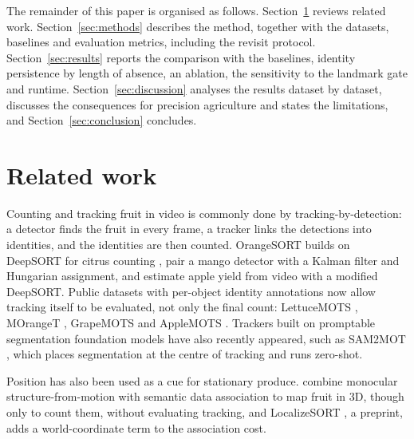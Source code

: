 \documentclass[pdflatex,sn-basic]{sn-jnl}%
\theoremstyle{thmstyleone}%
\begin{document}
The remainder of this paper is organised as follows.
Section~\ref{sec:related} reviews related work.
Section~\ref{sec:methods} describes the method, together with the datasets, baselines and evaluation metrics, including the revisit protocol.
Section~\ref{sec:results} reports the comparison with the baselines, identity persistence by length of absence, an ablation, the sensitivity to the landmark gate and runtime.
Section~\ref{sec:discussion} analyses the results dataset by dataset, discusses the consequences for precision agriculture and states the limitations, and Section~\ref{sec:conclusion} concludes.

\section{Related work}\label{sec:related}

Counting and tracking fruit in video is commonly done by tracking-by-detection: a detector finds the fruit in every frame, a tracker links the detections into identities, and the identities are then counted.
OrangeSORT builds on DeepSORT for citrus counting \citep{zhang2022citrus}, \citet{wang2019mango} pair a mango detector with a Kalman filter and Hungarian assignment, and \citet{osman2021yield} estimate apple yield from video with a modified DeepSORT.
Public datasets with per-object identity annotations now allow tracking itself to be evaluated, not only the final count: LettuceMOTS \citep{hu2024lettucemots}, MOrangeT \citep{santos2024moranget}, GrapeMOTS \citep{arizasentis2024grapemots} and AppleMOTS \citep{dejong2022applemots}.
Trackers built on promptable segmentation foundation models have also recently appeared, such as SAM2MOT \citep{jiang2026sam2mot}, which places segmentation at the centre of tracking and runs zero-shot.

Position has also been used as a cue for stationary produce.
\citet{liu2019monocular} combine monocular structure-from-motion with semantic data association to map fruit in 3D, though only to count them, without evaluating tracking, and LocalizeSORT \citep{vemuru2024localizesort}, a preprint, adds a world-coordinate term to the association cost.
\end{document}
